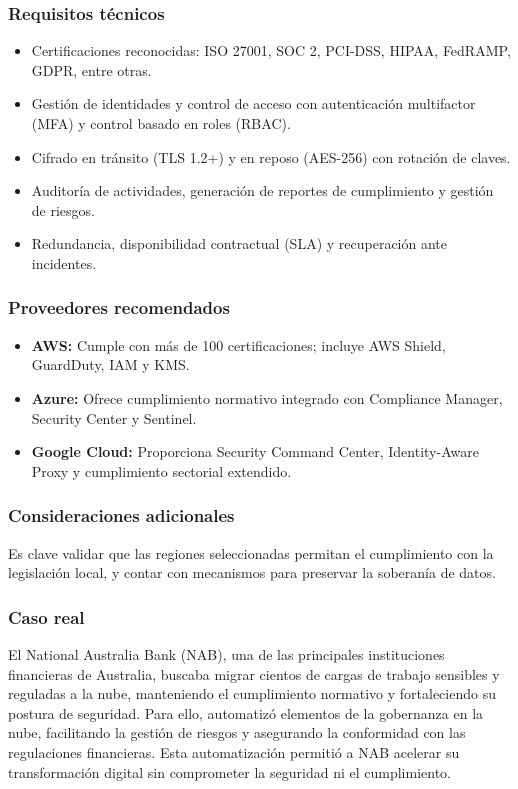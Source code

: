 {            \subsubsection{Requisitos técnicos}
                \begin{itemize}
                    \item Certificaciones reconocidas: ISO 27001, SOC 2, PCI-DSS, HIPAA, FedRAMP, GDPR, entre otras.
                    \item Gestión de identidades y control de acceso con autenticación multifactor (MFA) y control basado en roles (RBAC).
                    \item Cifrado en tránsito (TLS 1.2+) y en reposo (AES-256) con rotación de claves.
                    \item Auditoría de actividades, generación de reportes de cumplimiento y gestión de riesgos.
                    \item Redundancia, disponibilidad contractual (SLA) y recuperación ante incidentes.
                \end{itemize}
                
            \subsubsection{Proveedores recomendados}
                \begin{itemize}
                    \item \textbf{AWS:} Cumple con más de 100 certificaciones; incluye AWS Shield, GuardDuty, IAM y KMS.
                    \item \textbf{Azure:} Ofrece cumplimiento normativo integrado con Compliance Manager, Security Center y Sentinel.
                    \item \textbf{Google Cloud:} Proporciona Security Command Center, Identity-Aware Proxy y cumplimiento sectorial extendido.
                \end{itemize}
                
            \subsubsection{Consideraciones adicionales}
                Es clave validar que las regiones seleccionadas permitan el cumplimiento con la legislación local, y contar con mecanismos para preservar la soberanía de datos.

            \subsubsection{Caso real}
                El National Australia Bank (NAB), una de las principales instituciones financieras de Australia, buscaba migrar cientos de cargas de trabajo sensibles y reguladas a la nube, manteniendo el cumplimiento normativo y fortaleciendo su postura de seguridad. Para ello, automatizó elementos de la gobernanza en la nube, facilitando la gestión de riesgos y asegurando la conformidad con las regulaciones financieras. Esta automatización permitió a NAB acelerar su transformación digital sin comprometer la seguridad ni el cumplimiento. 

}

